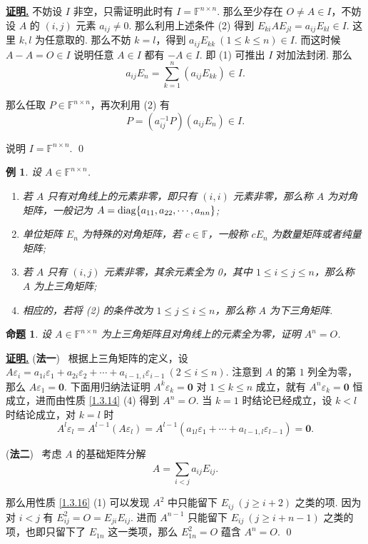 \documentclass[10pt,openany]{article}
\theoremstyle{thmstyle} %
\theoremstyle{defstyle} %
\theoremstyle{prostyle} %
\newtheorem{proposition}[theorem]{命题}
\theoremstyle{exastyle}
\newtheorem{example}[theorem]{例}
\theoremstyle{remstyle}
\renewenvironment{proof}[1][证明]{\par\underline{\textbf{#1.}} \;\fangsong}{\qed\par}
\newcommand{\F}{\mathbb{F}}
\begin{document}
\begin{proof}
	不妨设 \( I \) 非空，只需证明此时有 \( I=\F^{n \times n} \). 那么至少存在 \( O \neq A \in I \)，不妨设 \( A \) 的 \( (i,j)\) 元素 \( a_{ij} \neq 0 \). 那么利用上述条件 (2) 得到 \( E_{ki}AE_{jl}=a_{ij}E_{kl} \in I \). 这里 \( k,l \) 为任意取的. 那么不妨 \( k=l \)，得到 \( a_{ij}E_{kk} \ (1 \leq k \leq n) \in I \). 而这时候 \( A-A=O \in I \) 说明任意 \( A \in I  \) 都有 \( -A \in I \). 即 (1) 可推出 \( I \) 对加法封闭. 那么
	\[ a_{ij}E_n=\sum_{k=1}^{n} (a_{ij}E_{kk}) \in I. \]
	
	那么任取 \( P \in \F^{n \times n} \)，再次利用 (2) 有 
	\[ P= (a_{ij}^{-1}P)(a_{ij}E_n) \in I. \]
	
	说明 \( I=\F^{n \times n} \).
\end{proof}

\begin{example}
	设 \( A \in \F^{n \times n} \).
	\begin{enumerate}[(1)]
		\item 若 \( A \) 只有对角线上的元素非零，即只有 \( (i,i) \) 元素非零，那么称 \( A \) 为对角矩阵，一般记为 \( A=\mathrm{diag}\{a_{11},a_{22},\cdots \\ ,a_{nn} \} \);
		\item 单位矩阵 \( E_n \) 为特殊的对角矩阵，若 \( c \in \F \)，一般称 \( cE_n \) 为数量矩阵或者纯量矩阵;
		\item 若 \( A \) 只有 \( (i,j) \) 元素非零，其余元素全为 0，其中 \( 1 \leq i \leq j \leq n \)，那么称 \( A \) 为上三角矩阵;
		\item 相应的，若将 (2) 的条件改为 \( 1 \leq j \leq i \leq n \)，那么称 \( A \) 为下三角矩阵.
	\end{enumerate}
\end{example}

\begin{proposition}	\label{1.3.19}
	设 \( A \in \F^{n \times n} \) 为上三角矩阵且对角线上的元素全为零，证明 \( A^n=O \).

\end{proposition}

\begin{proof}
	(\textbf{法一}) \ 根据上三角矩阵的定义，设 \( A\varepsilon_i=a_{1i}\varepsilon_1+a_{2i}\varepsilon_2+\cdots+a_{i-1,i}\varepsilon_{i-1} \ (2 \leq i \leq n)\). 注意到 \( A \) 的第 \( 1 \) 列全为零，那么 \( A\varepsilon_1=\bm{0} \). 下面用归纳法证明 \( A^k\varepsilon_k=\bm{0} \) 对 \( 1 \leq k \leq n \) 成立，就有 \( A^n\varepsilon_k =\bm{0} \) 恒成立，进而由性质 \ref{1.3.14} (4) 得到 \( A^n=O \). 当 \( k=1 \) 时结论已经成立，设 \( k<l \) 时结论成立，对 \( k=l \) 时
	\[ A^l\varepsilon_l= A^{l-1}(A\varepsilon_l)=A^{l-1}(a_{1l}\varepsilon_1+\cdots+a_{l-1,l}\varepsilon_{l-1})=\bm{0}. \]
	
	(\textbf{法二}) \ 考虑 \( A \) 的基础矩阵分解
	\[ A=\sum_{i < j}^{} a_{ij}E_{ij}. \]
	
	那么用性质 \ref{1.3.16} (1) 可以发现 \( A^2 \) 中只能留下 \( E_{ij} \ (j \geq i+2) \) 之类的项. 因为对 \( i<j \) 有 \( E_{ij}^2=O=E_{ji}E_{ij} \). 进而 \( A^{n-1} \) 只能留下 \( E_{ij} \ (j \geq i+n-1) \) 之类的项，也即只留下了 \( E_{1n} \) 这一类项，那么 \( E_{1n}^2=O \) 蕴含 \( A^n=O \).
\end{proof}
\end{document}
